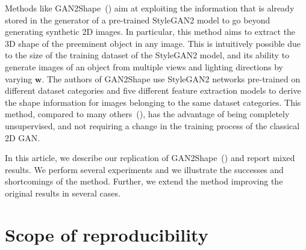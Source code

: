 Methods like GAN2Shape~(\cite{gan2shape}) aim at exploiting the information that is already stored in the generator of a pre-trained StyleGAN2 model to go beyond generating synthetic 2D images. In particular, this method aims to extract the 3D shape of the preeminent object in any image. This is intuitively possible due to the size of the training dataset of the StyleGAN2 model,  and its ability to generate images of an object from multiple views and lighting directions by varying $\mathbf{w}$. The authors of GAN2Shape use StyleGAN2 networks pre-trained on different dataset categories and five different feature extraction models to derive the shape information for images belonging to the same dataset categories. This method, compared to many others~(\cite{lunz2020inverse, henzler2019escaping, wu20153d, wang2019deep}), has the advantage of being completely unsupervised, and not requiring a change in the training process of the classical 2D GAN. 

In this article, we describe our replication of GAN2Shape~(\cite{gan2shape}) and report mixed results. 
We perform several experiments and we illustrate the successes and shortcomings of the method. Further, we extend the method improving the original results in several cases.

\section{Scope of reproducibility}
\label{sec:claims}


